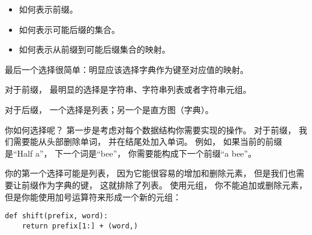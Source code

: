 \begin{itemize}
\item 如何表示前缀。  
\item 如何表示可能后缀的集合。  
\item 如何表示从前缀到可能后缀集合的映射。  
\end{itemize}


最后一个选择很简单：明显应该选择字典作为键至对应值的映射。  


对于前缀， 最明显的选择是字符串、字符串列表或者字符串元组。  


对于后缀， 一个选择是列表；另一个是直方图（字典）。  



你如何选择呢？ 第一步是考虑对每个数据结构你需要实现的操作。  
对于前缀， 我们需要能从头部删除单词， 并在结尾处加入单词。  
例如， 如果当前的前缀是``Half a''， 下一个词是``bee''， 
你需要能构成下一个前缀``a bee''。  


你的第一个选择可能是列表， 因为它能很容易的增加和删除元素， 
但是我们也需要让前缀作为字典的键， 这就排除了列表。  
使用元组， 你不能追加或删除元素， 
但是你能使用加号运算符来形成一个新的元组：

\begin{lstlisting}
def shift(prefix, word):
    return prefix[1:] + (word,)
\end{lstlisting}

